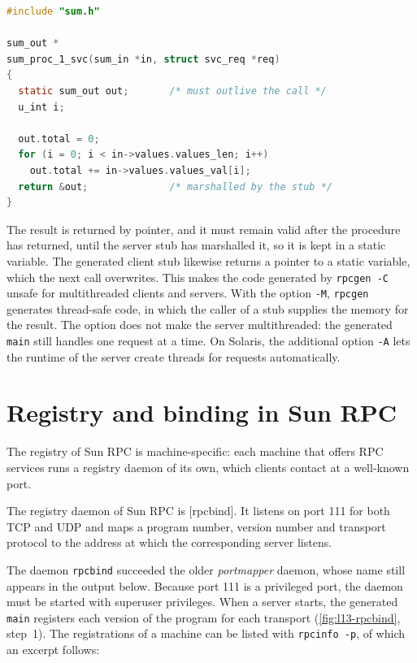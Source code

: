 \documentclass[../main.tex]{subfiles}
\begin{document}
\begin{lstlisting}[language=C, numbers=none]
#include "sum.h"

sum_out *
sum_proc_1_svc(sum_in *in, struct svc_req *req)
{
  static sum_out out;       /* must outlive the call */
  u_int i;

  out.total = 0;
  for (i = 0; i < in->values.values_len; i++)
    out.total += in->values.values_val[i];
  return &out;              /* marshalled by the stub */
}
\end{lstlisting}

The result is returned by pointer, and it must remain valid after the
procedure has returned, until the server stub has marshalled it, so it is
kept in a static variable.  The generated client stub likewise returns a
pointer to a static variable, which the next call overwrites.  This makes
the code generated by \texttt{rpcgen -C} unsafe for multithreaded clients
and servers.  With the option \texttt{-M}, \texttt{rpcgen} generates
thread-safe code, in which the caller of a stub supplies the memory for the
result.  The option does not make the server multithreaded: the generated
\texttt{main} still handles one request at a time.  On Solaris, the
additional option \texttt{-A} lets the runtime of the server create threads
for requests automatically.

\section{Registry and binding in Sun RPC}
\label{sec:l13-sun-binding}

The registry of Sun RPC is machine-specific: each machine that offers RPC
services runs a registry daemon of its own, which clients contact at a
well-known port.

\begin{definition}[rpcbind]
  The registry daemon of Sun RPC is [rpcbind].  It listens
  on port 111 for both TCP and UDP and maps a program number, version
  number and transport protocol to the address at which the corresponding
  server listens.
\end{definition}

The daemon \texttt{rpcbind} succeeded the older \emph{portmapper} daemon,
whose name still appears in the output below.  Because port 111 is a
privileged port, the daemon must be started with superuser privileges.  When a server starts, the generated
\texttt{main} registers each version of the program for each transport
(\cref{fig:l13-rpcbind}, step~1).  The registrations of a machine can be
listed with \texttt{rpcinfo -p}, of which an excerpt
follows:
\end{document}
